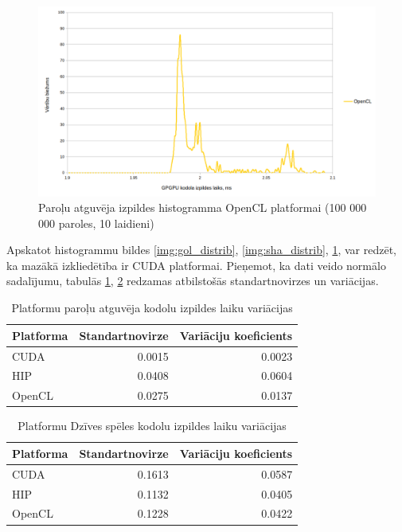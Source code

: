 \begin{figure}[H] \centering
    \includegraphics[width=\textwidth]{images/sha_distrib_opencl.png}
    \caption{Paroļu atguvēja izpildes histogramma OpenCL platformai (100 000
    000 paroles, 10 laidieni)} \label{img:sha_distrib_cl}
\end{figure}

Apskatot histogrammu bildes \ref{img:gol_distrib}, \ref{img:sha_distrib},
\ref{img:sha_distrib_cl}, var redzēt, ka mazākā izkliedētība ir CUDA
platformai. Pieņemot, ka dati veido normālo sadalījumu, tabulās \ref{tab:kern},
\ref{tab:kernel_exec_time_variations_gol} redzamas atbilstošās standartnovirzes
un variācijas.


\begin{table}[H]
    \centering
    \begin{tabular}{lrr}
    \hline
    \textbf{Platforma} & \textbf{Standartnovirze} & \textbf{Variāciju koeficients}\\ \hline
    CUDA    & 0.0015 & 0.0023 \\
    HIP     & 0.0408 & 0.0604  \\
    OpenCL  & 0.0275 & 0.0137 \\
    \hline
    \end{tabular}
    \caption{Platformu paroļu atguvēja kodolu izpildes laiku variācijas}
    \label{tab:kern} 
\end{table}


\begin{table}[H]
    \centering
    \begin{tabular}{lrr}
    \hline
    \textbf{Platforma} & \textbf{Standartnovirze} & \textbf{Variāciju koeficients}\\ \hline
    CUDA    & 0.1613 & 0.0587 \\
    HIP     & 0.1132 & 0.0405  \\
    OpenCL  & 0.1228 & 0.0422 \\
    \hline
    \end{tabular}
    \caption{Platformu Dzīves spēles kodolu izpildes laiku variācijas}
    \label{tab:kernel_exec_time_variations_gol} 
\end{table}


